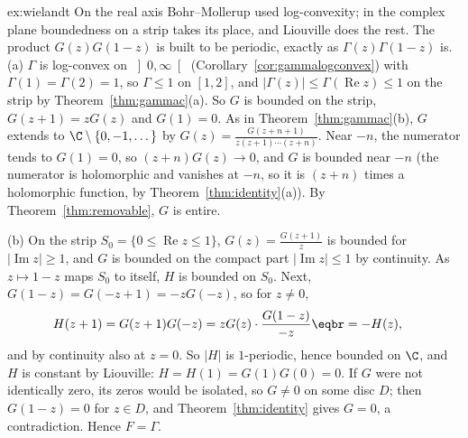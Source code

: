 \begin{solution}{ex:wielandt}
\idea On the real axis Bohr--Mollerup used log-convexity; in the complex plane boundedness on a strip takes its place, and
Liouville does the rest. The product $G(z)G(1-z)$ is built to be periodic, exactly as $\Gamma(z)\Gamma(1-z)$ is.
\writeup (a) $\Gamma$ is log-convex on $\left]0,\infty\right[$ (Corollary~\ref{cor:gammalogconvex}) with $\Gamma(1)=\Gamma(2)=1$, so $\Gamma\le1$ on $[1,2]$, and $|\Gamma(z)|\le\Gamma(\operatorname{Re}z)\le1$ on the
strip by Theorem~\ref{thm:gammac}(a). So $G$ is bounded on the strip, $G(z+1)=zG(z)$ and $G(1)=0$. As in Theorem~\ref{thm:gammac}(b), $G$ extends to
$\C\setminus\{0,-1,\dots\}$ by $G(z)=\frac{G(z+n+1)}{z(z+1)\cdots(z+n)}$. Near $-n$, the numerator tends to $G(1)=0$, so $(z+n)G(z)\to0$, and $G$ is bounded near $-n$ (the numerator is
holomorphic and vanishes at $-n$, so it is $(z+n)$ times a holomorphic function, by Theorem~\ref{thm:identity}(a)). By Theorem~\ref{thm:removable}, $G$ is entire.

(b) On the strip $S_0=\{0\le\operatorname{Re}z\le1\}$, $G(z)=\frac{G(z+1)}z$ is bounded for $|\operatorname{Im}z|\ge1$, and $G$ is bounded on the compact part $|\operatorname{Im}z|\le1$ by continuity.
As $z\mapsto1-z$ maps $S_0$ to itself, $H$ is bounded on $S_0$. Next, $G(1-z)=G(-z+1)=-zG(-z)$, so for $z\ne0$,
\[
\begin{aligned}H(z+1)&=G(z+1)G(-z)=zG(z)\cdot\frac{G(1-z)}{-z}\eqbr=-H(z),\end{aligned}
\]
and by continuity also at $z=0$. So $|H|$ is $1$-periodic, hence bounded on $\C$, and $H$ is constant by Liouville: $H=H(1)=G(1)G(0)=0$. If $G$ were not
identically zero, its zeros would be isolated, so $G\ne0$ on some disc $D$; then $G(1-z)=0$ for $z\in D$, and Theorem~\ref{thm:identity} gives $G=0$, a
contradiction. Hence $F=\Gamma$.
\end{solution}

